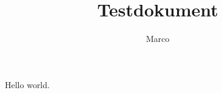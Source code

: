 \documentclass{article}
\author{Marco}
\title{Testdokument}
\begin{document}
\maketitle
Hello world. 
\end{document}

